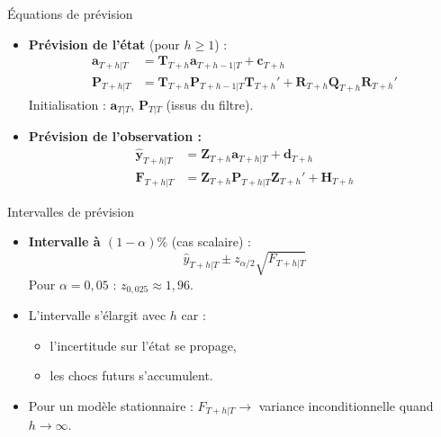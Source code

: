 \documentclass[11pt,aspectratio=169]{beamer}
\begin{document}
\begin{frame}{Équations de prévision}

\begin{itemize}

\item \textbf{Prévision de l'état} (pour $h \geq 1$) :
  \begin{align*}
  \bm{a}_{T+h|T} &= \bm{T}_{T+h} \bm{a}_{T+h-1|T} + \bm{c}_{T+h} \\
  \bm{P}_{T+h|T} &= \bm{T}_{T+h} \bm{P}_{T+h-1|T} \bm{T}_{T+h}' + \bm{R}_{T+h} \bm{Q}_{T+h} \bm{R}_{T+h}'
  \end{align*}
  Initialisation : $\bm{a}_{T|T}$, $\bm{P}_{T|T}$ (issus du filtre).\newline

\item \textbf{Prévision de l'observation :}
  \begin{align*}
  \hat{\bm{y}}_{T+h|T} &= \bm{Z}_{T+h} \bm{a}_{T+h|T} + \bm{d}_{T+h} \\
  \bm{F}_{T+h|T} &= \bm{Z}_{T+h} \bm{P}_{T+h|T} \bm{Z}_{T+h}' + \bm{H}_{T+h}
  \end{align*}

\end{itemize}

\end{frame}

\begin{frame}{Intervalles de prévision}

\begin{itemize}

\item \textbf{Intervalle à $(1-\alpha)\%$} (cas scalaire) :
  \[
  \hat{y}_{T+h|T} \pm z_{\alpha/2} \sqrt{F_{T+h|T}}
  \]
  Pour $\alpha = 0{,}05$ : $z_{0{,}025} \approx 1{,}96$.\newline

\item L'intervalle s'élargit avec $h$ car :
  \begin{itemize}
  \item l'incertitude sur l'état se propage,
  \item les chocs futurs s'accumulent.
  \end{itemize}

\item Pour un modèle stationnaire : $F_{T+h|T} \to$ variance inconditionnelle quand $h \to \infty$.

\end{itemize}

\end{frame}
\end{document}
